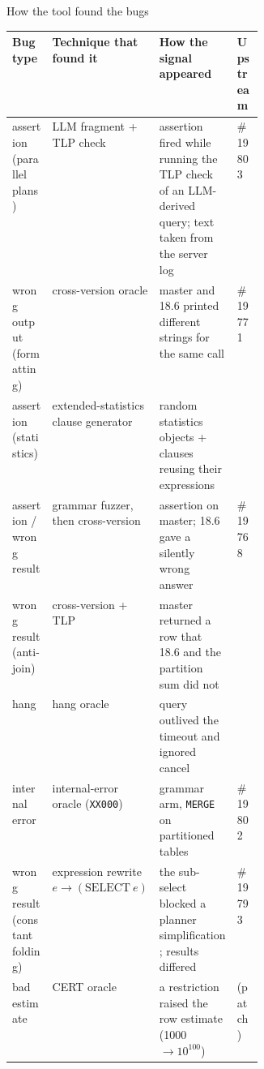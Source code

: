 \documentclass[aspectratio=169,10pt]{beamer}
\begin{document}
\begin{frame}{How the tool found the \pg bugs}
\scriptsize
\begin{tabularx}{\linewidth}{@{}L{0.16\linewidth}L{0.2\linewidth}Yl@{}}
\toprule
Bug type & Technique that found it & How the signal appeared & Upstream \\
\midrule
assertion (parallel plans) & LLM fragment + TLP check & assertion fired while running the TLP check of an LLM-derived query; text taken from the server log &  \#19803 \\
wrong output (formatting) & cross-version oracle & master and 18.6 printed different strings for the same call &  \#19771 \\
assertion (statistics) & extended-statistics clause generator & random statistics objects + clauses reusing their expressions &  \\
assertion / wrong result & grammar fuzzer, then cross-version & assertion on master; 18.6 gave a silently wrong answer &  \#19768 \\
wrong result (anti-join) & cross-version + TLP & master returned a row that 18.6 and the partition sum did not &  \\
hang & hang oracle & query outlived the timeout and ignored cancel &  \\
internal error & internal-error oracle (\texttt{XX000}) & grammar arm, \texttt{MERGE} on partitioned tables &  \#19802 \\
wrong result (constant folding) & expression rewrite $e\rightarrow(\mathrm{SELECT}\ e)$ & the sub-select blocked a planner simplification; results differed &  \#19793 \\
bad estimate & CERT oracle & a restriction raised the row estimate (1000 $\rightarrow 10^{100}$) &  (patch) \\
\bottomrule
\end{tabularx}
\end{frame}
\end{document}
